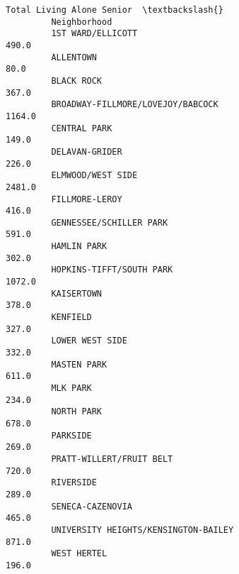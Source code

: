 \documentclass[11pt]{article}
\begin{document}
\begin{Verbatim}[commandchars=\\\{\}]
                                               Total Living Alone Senior  \textbackslash{}
         Neighborhood                                                      
         1ST WARD/ELLICOTT                                         490.0   
         ALLENTOWN                                                  80.0   
         BLACK ROCK                                                367.0   
         BROADWAY-FILLMORE/LOVEJOY/BABCOCK                        1164.0   
         CENTRAL PARK                                              149.0   
         DELAVAN-GRIDER                                            226.0   
         ELMWOOD/WEST SIDE                                        2481.0   
         FILLMORE-LEROY                                            416.0   
         GENNESSEE/SCHILLER PARK                                   591.0   
         HAMLIN PARK                                               302.0   
         HOPKINS-TIFFT/SOUTH PARK                                 1072.0   
         KAISERTOWN                                                378.0   
         KENFIELD                                                  327.0   
         LOWER WEST SIDE                                           332.0   
         MASTEN PARK                                               611.0   
         MLK PARK                                                  234.0   
         NORTH PARK                                                678.0   
         PARKSIDE                                                  269.0   
         PRATT-WILLERT/FRUIT BELT                                  720.0   
         RIVERSIDE                                                 289.0   
         SENECA-CAZENOVIA                                          465.0   
         UNIVERSITY HEIGHTS/KENSINGTON-BAILEY                      871.0   
         WEST HERTEL                                               196.0   
         

\end{Verbatim}
\end{document}
